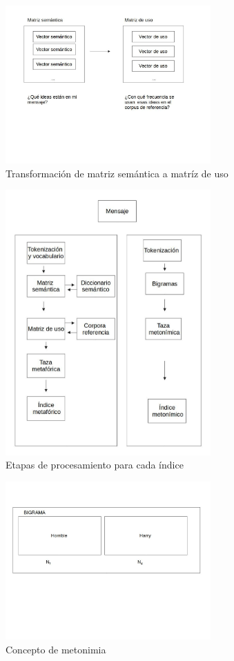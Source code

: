 \documentclass[12pt,letterpaper,twoside]{article}
\begin{document}
\begin{figure}[H]
\centering
\includegraphics[width=0.7\textwidth]{./assets/matrices.jpg}
\caption{\label{fig:matrices}Transformación de matriz semántica a matríz de uso}
\end{figure}




\begin{figure}[H]
\centering
\includegraphics[width=0.7\textwidth]{./assets/metodologia.jpg}
\caption{\label{fig:metodologia}Etapas de procesamiento para cada índice}
\end{figure}

\begin{figure}[H]
\centering
\includegraphics[width=0.7\textwidth]{./assets/metonimia.jpg}
\caption{\label{fig:metonimia}Concepto de metonimia}
\end{figure}
\end{document}
